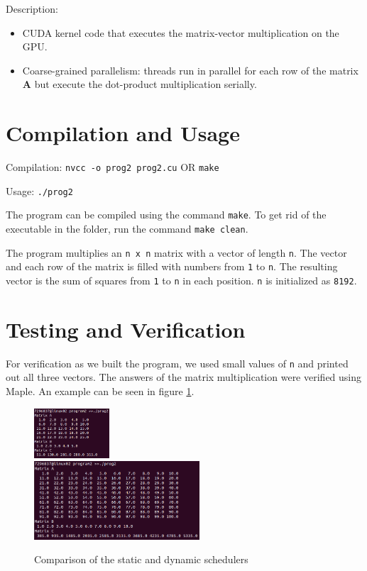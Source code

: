 \documentclass{article}
\begin{document}
\medskip
\noindent
Description:
\begin{itemize}
    \item CUDA kernel code that executes the matrix-vector multiplication on the
    GPU.
    
    \item Coarse-grained parallelism: threads run in parallel for each row of 
    the matrix
    \textbf{A} but execute the dot-product multiplication serially.
\end{itemize}

\section{Compilation and Usage}
Compilation: \texttt{nvcc -o prog2 prog2.cu} OR \texttt{make} 

\noindent
Usage: \texttt{./prog2}

\medskip
\noindent
The program can be compiled using the command \texttt{make}. To get rid of the 
executable in the folder, run the command \texttt{make clean}.

\medskip
\noindent
The program multiplies an \texttt{n x n} matrix with a vector of length 
\texttt{n}. The vector and each row of the matrix is filled with numbers from 
\texttt{1} to \texttt{n}. The resulting vector is the sum of squares from
\texttt{1} to \texttt{n} in each position. \texttt{n} is initialized as 
\texttt{8192}.

\section{Testing and Verification}
For verification as we built the program, we used small values of \texttt{n} 
and printed out all three vectors. The answers of the matrix multiplication were
verified using Maple. An example can be seen in figure \ref{fig:testing}.

\begin{figure}[ht]
	\centering
    \includegraphics[width=0.25\textwidth]{5x5.png} \\
    \includegraphics[width=0.55\textwidth]{10x10.png}
    \caption{Comparison of the static and dynamic schedulers}
    \label{fig:testing}
\end{figure}
\end{document}
